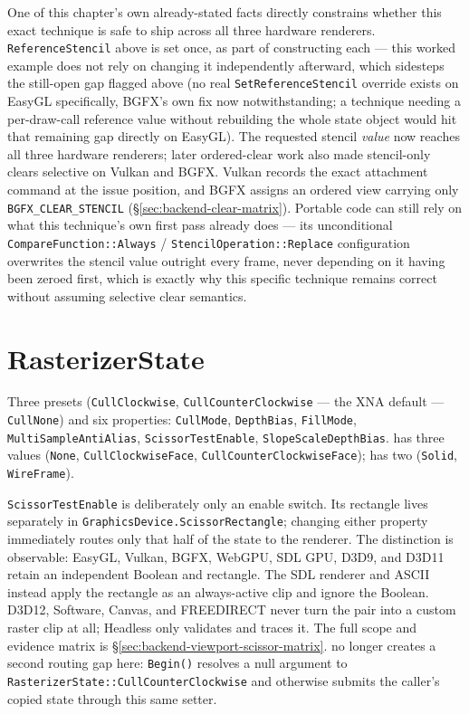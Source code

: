 One of this chapter's own already-stated facts directly constrains whether this exact
technique is safe to ship across all three hardware renderers. \texttt{ReferenceStencil} above
is set once, as part of constructing each  --- this worked example
does not rely on changing it independently afterward, which sidesteps the still-open gap
flagged above (no real \texttt{SetReferenceStencil} override exists on EasyGL specifically,
BGFX's own fix now notwithstanding; a technique needing a per-draw-call reference value without
rebuilding the whole state object would hit that remaining gap directly on EasyGL). The
requested stencil \emph{value} now reaches all three hardware renderers; later
ordered-clear work also made stencil-only clears selective on Vulkan and BGFX. Vulkan records
the exact attachment command at the issue position, and BGFX assigns an ordered view carrying
only \texttt{BGFX\_CLEAR\_STENCIL} (\S\ref{sec:backend-clear-matrix}). Portable code can still
rely on what this technique's own first pass already does --- its unconditional
\texttt{CompareFunction::Always} / \texttt{StencilOperation::Replace} configuration overwrites
the stencil value outright every frame, never depending on it having been zeroed first, which
is exactly why this specific technique remains correct without assuming selective clear
semantics.

\section{RasterizerState}

Three presets (\texttt{CullClockwise}, \texttt{CullCounterClockwise} --- the XNA default ---
\texttt{CullNone}) and six properties: \texttt{CullMode}, \texttt{DepthBias},
\texttt{FillMode}, \texttt{MultiSampleAntiAlias}, \texttt{ScissorTestEnable},
\texttt{SlopeScaleDepthBias}.  has three values
(\texttt{None}, \texttt{CullClockwiseFace}, \texttt{CullCounterClockwiseFace});
 has two (\texttt{Solid}, \texttt{WireFrame}).

\texttt{ScissorTestEnable} is deliberately only an enable switch. Its rectangle lives
separately in \texttt{GraphicsDevice.ScissorRectangle}; changing either property immediately
routes only that half of the state to the renderer. The distinction is observable: EasyGL,
Vulkan, BGFX, WebGPU, SDL GPU, D3D9, and D3D11 retain an independent Boolean and rectangle.
The SDL renderer and ASCII instead apply the rectangle as an always-active clip and ignore the
Boolean. D3D12, Software, Canvas, and FREEDIRECT never turn the pair into a custom raster clip at all;
Headless only validates and traces it. The full scope and evidence matrix is
\S\ref{sec:backend-viewport-scissor-matrix}.  no longer creates a second
routing gap here: \texttt{Begin()} resolves a null argument to
\texttt{RasterizerState::CullCounterClockwise} and otherwise submits the caller's copied state
through this same  setter.


